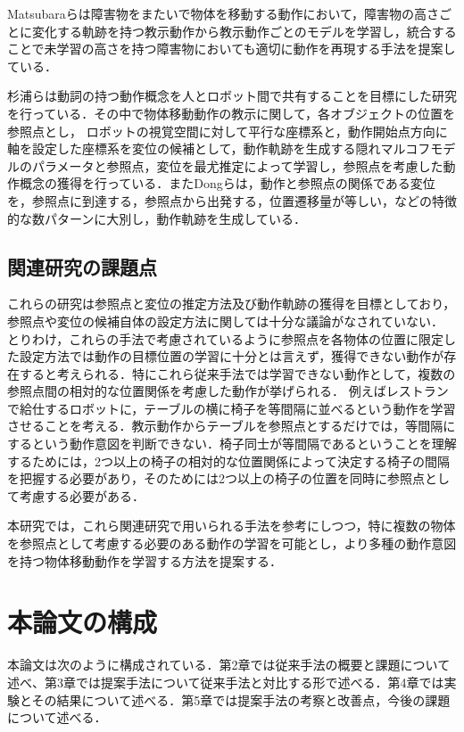Matsubaraら\cite{matsubara}は障害物をまたいで物体を移動する動作において，障害物の高さごとに変化する軌跡を持つ教示動作から教示動作ごとのモデルを学習し，統合することで未学習の高さを持つ障害物においても適切に動作を再現する手法を提案している．

杉浦ら\cite{sugiura}は動詞の持つ動作概念を人とロボット間で共有することを目標にした研究を行っている．その中で物体移動動作の教示に関して，各オブジェクトの位置を参照点とし，
ロボットの視覚空間に対して平行な座標系と，動作開始点方向に軸を設定した座標系を変位の候補として，動作軌跡を生成する隠れマルコフモデル\cite{hmm}のパラメータと参照点，変位を最尤推定によって学習し，参照点を考慮した動作概念の獲得を行っている．またDongら\cite{dong}は，動作と参照点の関係である変位を，参照点に到達する，参照点から出発する，位置遷移量が等しい，などの特徴的な数パターンに大別し，動作軌跡を生成している．

\subsection{関連研究の課題点}\label{kadai}

これらの研究は参照点と変位の推定方法及び動作軌跡の獲得を目標としており，参照点や変位の候補自体の設定方法に関しては十分な議論がなされていない．
とりわけ，これらの手法で考慮されているように参照点を各物体の位置に限定した設定方法では動作の目標位置の学習に十分とは言えず，獲得できない動作が存在すると考えられる．特にこれら従来手法では学習できない動作として，複数の参照点間の相対的な位置関係を考慮した動作が挙げられる．
例えばレストランで給仕するロボットに，テーブルの横に椅子を等間隔に並べるという動作を学習させることを考える．教示動作からテーブルを参照点とするだけでは，等間隔にするという動作意図を判断できない．椅子同士が等間隔であるということを理解するためには，2つ以上の椅子の相対的な位置関係によって決定する椅子の間隔を把握する必要があり，そのためには2つ以上の椅子の位置を同時に参照点として考慮する必要がある．

本研究では，これら関連研究で用いられる手法を参考にしつつ，特に複数の物体を参照点として考慮する必要のある動作の学習を可能とし，より多種の動作意図を持つ物体移動動作を学習する方法を提案する．        

\section{本論文の構成}

本論文は次のように構成されている．第2章では従来手法の概要と課題について述べ、第3章では提案手法について従来手法と対比する形で述べる．第4章では実験とその結果について述べる．第5章では提案手法の考察と改善点，今後の課題について述べる．	
